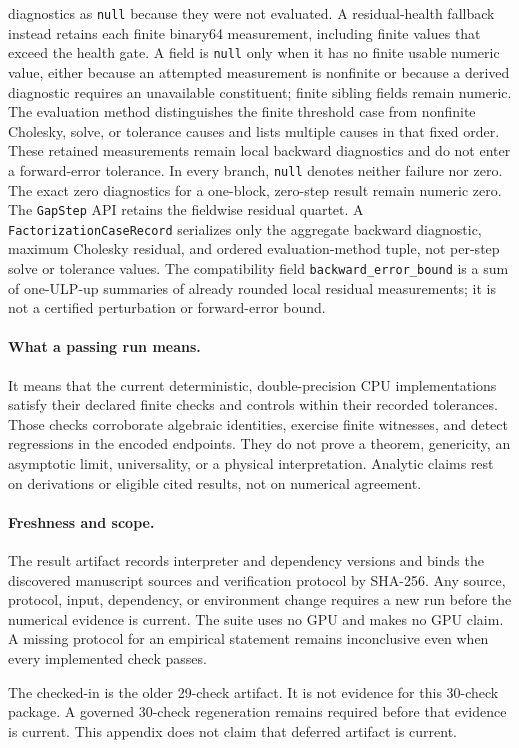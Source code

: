diagnostics as \texttt{null} because they were not evaluated.  A
residual-health fallback instead retains each finite binary64 measurement,
including finite values that exceed the health gate.  A field is
\texttt{null} only when it has no finite usable numeric value, either because
an attempted measurement is nonfinite or because a derived diagnostic requires
an unavailable constituent; finite sibling fields remain numeric.  The
evaluation method distinguishes the finite threshold case from nonfinite
Cholesky, solve, or tolerance causes and lists multiple causes in that fixed
order.  These retained measurements remain local backward diagnostics and do
not enter a forward-error tolerance.  In every branch, \texttt{null} denotes
neither failure nor zero.  The exact zero diagnostics for a one-block,
zero-step result remain numeric zero.  The \texttt{GapStep} API retains the
fieldwise residual quartet.  A \texttt{FactorizationCaseRecord} serializes only
the aggregate backward diagnostic, maximum Cholesky residual, and ordered
evaluation-method tuple, not per-step solve or tolerance values.  The
compatibility field \texttt{backward\_error\_bound} is a sum of one-ULP-up
summaries of already rounded local residual measurements; it is not a
certified perturbation or forward-error bound. 

\paragraph{What a passing run means.}
It means that the current deterministic, double-precision CPU
implementations satisfy their declared finite checks and controls within
their recorded tolerances.  Those checks corroborate algebraic identities,
exercise finite witnesses, and detect regressions in the encoded endpoints.
They do not prove a theorem, genericity, an asymptotic limit, universality,
or a physical interpretation.  Analytic claims rest on derivations or
eligible cited results, not on numerical agreement.

\paragraph{Freshness and scope.}
The result artifact records interpreter and dependency versions and binds
the discovered manuscript sources and verification protocol by SHA-256.
Any source, protocol, input, dependency, or environment change requires a
new run before the numerical evidence is current.  The suite uses no GPU and
makes no GPU claim.  A missing protocol for an empirical statement remains
inconclusive even when every implemented check passes.

The checked-in  is the older
29-check artifact.  It is not evidence for this 30-check package.  A governed
30-check regeneration remains required before that evidence is current.  This
appendix does not claim that deferred artifact is current.
